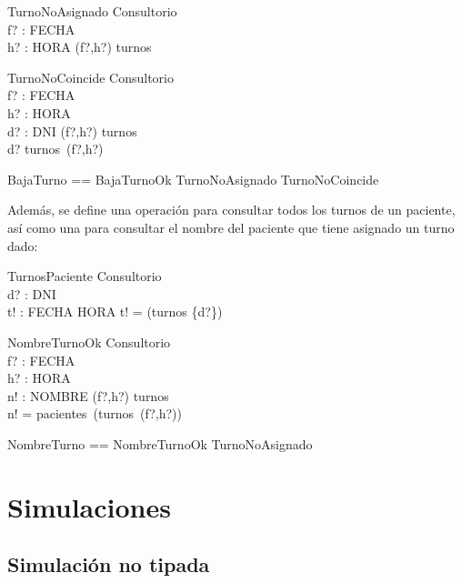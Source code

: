 \documentclass[12pt]{article}
\begin{document}
\begin{schema}{TurnoNoAsignado}
\Xi Consultorio \\
f? : FECHA \\
h? : HORA
\where
(f?,h?) \notin \dom turnos
\end{schema}

\begin{schema}{TurnoNoCoincide}
\Xi Consultorio \\
f? : FECHA \\
h? : HORA \\
d? : DNI
\where
(f?,h?) \in \dom turnos \\
d? \neq turnos\ (f?,h?)
\end{schema}

\begin{zed}
BajaTurno == BajaTurnoOk \lor TurnoNoAsignado \lor TurnoNoCoincide
\end{zed}

Además, se define una operación para consultar todos los turnos de un paciente, así como una para consultar el nombre del paciente que tiene asignado un turno dado:

\begin{schema}{TurnosPaciente}
\Xi Consultorio \\
d? : DNI \\
t! : FECHA \rel HORA
\where
t! = \dom (turnos \rres \{d?\})
\end{schema}

\begin{schema}{NombreTurnoOk}
\Xi Consultorio \\
f? : FECHA \\
h? : HORA \\
n! : NOMBRE
\where
(f?,h?) \in \dom turnos \\
n! = pacientes\ (turnos\ (f?,h?))
\end{schema}

\begin{zed}
NombreTurno == NombreTurnoOk \lor TurnoNoAsignado
\end{zed}

\section*{Simulaciones}

\subsection*{Simulación no tipada}
\end{document}
